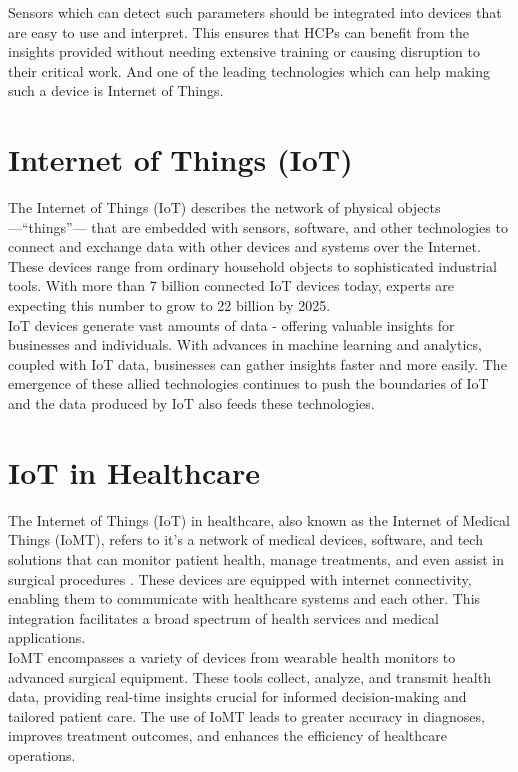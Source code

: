 \noindent Sensors which can detect such parameters should be integrated into devices that are easy to use and interpret. This ensures that HCPs can benefit from the insights provided without needing extensive training or causing disruption to their critical work. And one of the leading technologies which can help making such a device is Internet of Things.


\section{Internet of Things (IoT)}
The Internet of Things (IoT) describes the network of physical objects —``things”— that are embedded with sensors, software, and other technologies to connect and exchange data with other devices and systems over the Internet. These devices range from ordinary household objects to sophisticated industrial tools. With more than 7 billion connected IoT devices today, experts are expecting this number to grow to 22 billion by 2025. \cite{ref16}\\


\noindent IoT devices generate vast amounts of data - offering valuable insights for businesses and individuals. With advances in machine learning and analytics, coupled with IoT data, businesses can gather insights faster and more easily. The emergence of these allied technologies continues to push the boundaries of IoT and the data produced by IoT also feeds these technologies. \cite{ref16}

\section{IoT in Healthcare}
The Internet of Things (IoT) in healthcare, also known as the Internet of Medical Things (IoMT), refers to  it’s a network of medical devices, software, and tech solutions that can monitor patient health, manage treatments, and even assist in surgical procedures \cite{47}. These devices are equipped with internet connectivity, enabling them to communicate with healthcare systems and each other. This integration facilitates a broad spectrum of health services and medical applications. \\

IoMT encompasses a variety of devices from wearable health monitors to advanced surgical equipment. These tools collect, analyze, and transmit health data, providing real-time insights crucial for informed decision-making and tailored patient care. The use of IoMT leads to greater accuracy in diagnoses, improves treatment outcomes, and enhances the efficiency of healthcare operations.\\



